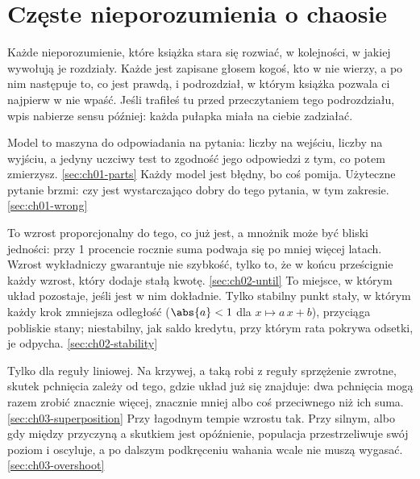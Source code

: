 
\chapter{Częste nieporozumienia o chaosie}
\label{app:misreadings}

\noindent
Każde nieporozumienie, które książka stara się rozwiać, w kolejności, w jakiej wywołują je rozdziały. Każde jest zapisane głosem kogoś, kto w nie wierzy, a po nim następuje to, co jest prawdą, i podrozdział, w którym książka pozwala ci najpierw w nie wpaść. Jeśli trafiłeś tu przed przeczytaniem tego podrozdziału, wpis nabierze sensu później: każda pułapka miała na ciebie zadziałać.

%
  {Model to maszyna do odpowiadania na pytania: liczby na wejściu, liczby na wyjściu, a jedyny uczciwy test to zgodność jego odpowiedzi z tym, co potem zmierzysz.}%
  {\ref{sec:ch01-parts}}
%
  {Każdy model jest błędny, bo coś pomija. Użyteczne pytanie brzmi: czy jest wystarczająco dobry do tego pytania, w tym zakresie.}%
  {\ref{sec:ch01-wrong}}

%
  {To wzrost proporcjonalny do tego, co już jest, a mnożnik może być bliski jedności: przy 1 procencie rocznie suma podwaja się po mniej więcej  latach. Wzrost wykładniczy gwarantuje nie szybkość, tylko to, że w końcu prześcignie każdy wzrost, który dodaje stałą kwotę.}%
  {\ref{sec:ch02-until}}
%
  {To miejsce, w którym układ pozostaje, jeśli jest w nim dokładnie. Tylko stabilny punkt stały, w którym każdy krok zmniejsza odległość ($\abs{a} < 1$ dla $x \mapsto a\,x + b$), przyciąga pobliskie stany; niestabilny, jak saldo kredytu, przy którym rata pokrywa odsetki, je odpycha.}%
  {\ref{sec:ch02-stability}}

%
  {Tylko dla reguły liniowej. Na krzywej, a taką robi z reguły sprzężenie zwrotne, skutek pchnięcia zależy od tego, gdzie układ już się znajduje: dwa pchnięcia mogą razem zrobić znacznie więcej, znacznie mniej albo coś przeciwnego niż ich suma.}%
  {\ref{sec:ch03-superposition}}
%
  {Przy łagodnym tempie wzrostu tak. Przy silnym, albo gdy między przyczyną a skutkiem jest opóźnienie, populacja przestrzeliwuje swój poziom i oscyluje, a po dalszym podkręceniu wahania wcale nie muszą wygasać.}%
  {\ref{sec:ch03-overshoot}}


